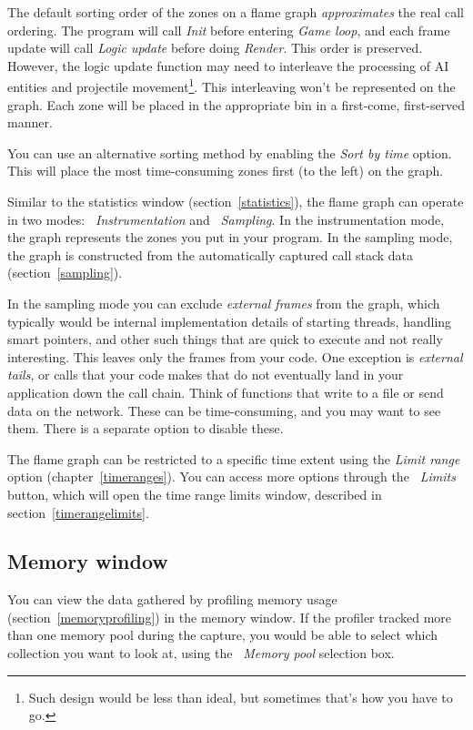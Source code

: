 \documentclass[hidelinks,titlepage,a4paper,twoside]{article}
\begin{document}
The default sorting order of the zones on a flame graph \emph{approximates} the real call ordering. The program will call \emph{Init} before entering \emph{Game loop}, and each frame update will call \emph{Logic update} before doing \emph{Render}. This order is preserved. However, the logic update function may need to interleave the processing of AI entities and projectile movement\footnote{Such design would be less than ideal, but sometimes that's how you have to go.}. This interleaving won't be represented on the graph. Each zone will be placed in the appropriate bin in a first-come, first-served manner.

You can use an alternative sorting method by enabling the \emph{Sort by time} option. This will place the most time-consuming zones first (to the left) on the graph.

Similar to the statistics window (section~\ref{statistics}), the flame graph can operate in two modes: \emph{\faSyringe{}~Instrumentation} and \emph{\faEyeDropper{}~Sampling}. In the instrumentation mode, the graph represents the zones you put in your program. In the sampling mode, the graph is constructed from the automatically captured call stack data (section~\ref{sampling}).

In the sampling mode you can exclude \emph{external frames} from the graph, which typically would be internal implementation details of starting threads, handling smart pointers, and other such things that are quick to execute and not really interesting. This leaves only the frames from your code. One exception is \emph{external tails}, or calls that your code makes that do not eventually land in your application down the call chain. Think of functions that write to a file or send data on the network. These can be time-consuming, and you may want to see them. There is a separate option to disable these.

The flame graph can be restricted to a specific time extent using the \emph{Limit range} option (chapter~\ref{timeranges}). You can access more options through the \emph{\faRuler{}~Limits} button, which will open the time range limits window, described in section~\ref{timerangelimits}.

\subsection{Memory window}
\label{memorywindow}

You can view the data gathered by profiling memory usage (section~\ref{memoryprofiling}) in the memory window. If the profiler tracked more than one memory pool during the capture, you would be able to select which collection you want to look at, using the \emph{\faArchive{}~Memory pool} selection box.
\end{document}
